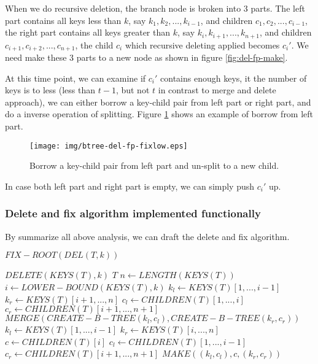 \documentclass{article}
\begin{document}
When we do recursive deletion, the branch node is broken into 3 parts.
The left part contains all keys less than $k$, say $k_1, k_2, ..., k_{i-1}$,
and children $c_1, c_2, ..., c_{i-1}$, the right part contains all keys
greater than $k$, say $k_i, k_{i+1}, ..., k_{n+1}$, and children
$c_{i+1}, c_{i+2}, ..., c_{n+1}$, the child $c_i$ which recursive deleting
applied becomes $c_i'$. We need make these 3 parts to a new node
as shown in figure \ref{fig:del-fp-make}.

At this time point, we can examine if $c_i'$ contains enough keys,
it the number of keys is to less (less than $t-1$, but not $t$ in
contrast to merge and delete approach), we can either borrow a key-child
pair from left part or right part, and do a inverse operation of
splitting. Figure \ref{fig:del-fp-fixlow} shows an example of borrow from left part.

\begin{figure}[htbp]
    \begin{center}
      \texttt{[image: img/btree-del-fp-fixlow.eps]}
      \caption{Borrow a key-child pair from left part and
un-split to a new child.} \label{fig:del-fp-fixlow}
    \end{center}
\end{figure}

In case both left part and right part is empty, we can simply
push $c_i'$ up.

\subsubsection{Delete and fix algorithm implemented functionally}

By summarize all above analysis, we can draft the delete and fix
algorithm.

\begin{algorithmic}[1]
  \State \Return $FIX-ROOT(DEL(T, k))$
\EndFunction

    \State $DELETE(KEYS(T), k)$
    \State \Return $T$
  \Else {}
    \State $n \gets LENGTH(KEYS(T))$
    \State $i \gets LOWER-BOUND(KEYS(T), k)$
      \State $k_l \gets KEYS(T)[1, ..., i-1]$
      \State $k_r \gets KEYS(T)[i+1, ..., n]$
      \State $c_l \gets CHILDREN(T)[1, ..., i]$
      \State $c_r \gets CHILDREN(T)[i+1, ..., n+1]$
      \State \Return $MERGE(CREATE-B-TREE(k_l, c_l), CREATE-B-TREE(k_r, c_r))$
    \Else
      \State $k_l \gets KEYS(T)[1, ..., i-1]$
      \State $k_r \gets KEYS(T)[i, ..., n]$
      \State $c \gets CHILDREN(T)[i]$
      \State $c_l \gets CHILDREN(T)[1, ..., i-1]$
      \State $c_r \gets CHILDREN(T)[i+1, ..., n+1]$
      \State \Return $MAKE((k_l, c_l), c, (k_r, c_r))$
    \EndIf
  \EndIf
\EndFunction
\end{algorithmic}
\end{document}
